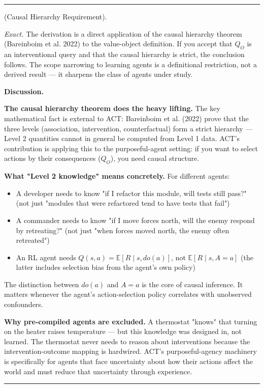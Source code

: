 \documentclass[11pt,oneside]{article}
\newcounter{claim}[section]
\renewcommand{\theclaim}{\thesection.\arabic{claim}}
\newenvironment{segment}[2]{%
  \refstepcounter{claim}%
  \bigskip\noindent\hrule\smallskip
  \noindent{\bfseries #1~\theclaim}\enskip(#2).\par\smallskip
  \noindent\ignorespaces
}{%
  \par\smallskip\noindent\hrule\bigskip
}
\newenvironment{proposition}[1][]{\begin{segment}{Proposition}{#1}}{\end{segment}}
\begin{document}
\begin{proposition}[Causal Hierarchy Requirement]
\textit{Exact.} The derivation is a direct application of the causal hierarchy theorem (Bareinboim et al. 2022) to the value-object definition. If you accept that $Q_O$ is an interventional query and that the causal hierarchy is strict, the conclusion follows. The scope narrowing to learning agents is a definitional restriction, not a derived result — it sharpens the class of agents under study.


\medskip\noindent\textbf{Discussion.}


\textbf{The causal hierarchy theorem does the heavy lifting.} The key mathematical fact is external to ACT: Bareinboim et al. (2022) prove that the three levels (association, intervention, counterfactual) form a strict hierarchy — Level 2 quantities cannot in general be computed from Level 1 data. ACT's contribution is applying this to the purposeful-agent setting: if you want to select actions by their consequences ($Q_O$), you need causal structure.

\textbf{What "Level 2 knowledge" means concretely.} For different agents:
\begin{itemize}
  \item A developer needs to know "if I refactor this module, will tests still pass?" (not just "modules that were refactored tend to have tests that fail")
  \item A commander needs to know "if I move forces north, will the enemy respond by retreating?" (not just "when forces moved north, the enemy often retreated")
  \item An RL agent needs $Q(s, a) = \mathbb{E}[R \mid s, do(a)]$, not $\mathbb{E}[R \mid s, A=a]$ (the latter includes selection bias from the agent's own policy)
\end{itemize}


The distinction between $do(a)$ and $A = a$ is the core of causal inference. It matters whenever the agent's action-selection policy correlates with unobserved confounders.

\textbf{Why pre-compiled agents are excluded.} A thermostat "knows" that turning on the heater raises temperature — but this knowledge was designed in, not learned. The thermostat never needs to reason about interventions because the intervention-outcome mapping is hardwired. ACT's purposeful-agency machinery is specifically for agents that face uncertainty about how their actions affect the world and must reduce that uncertainty through experience.

\end{proposition}
\end{document}
